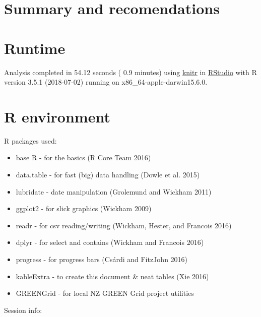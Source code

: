 \documentclass[]{article}
\providecommand{\tightlist}{%
  \setlength{\itemsep}{0pt}\setlength{\parskip}{0pt}}
\theoremstyle{definition}
\theoremstyle{definition}
\theoremstyle{definition}
\theoremstyle{remark}
\begin{document}
\section{Summary and recomendations}\label{summary-and-recomendations}

\section{Runtime}\label{runtime}

Analysis completed in 54.12 seconds ( 0.9 minutes) using
\href{https://cran.r-project.org/package=knitr}{knitr} in
\href{http://www.rstudio.com}{RStudio} with R version 3.5.1 (2018-07-02)
running on x86\_64-apple-darwin15.6.0.

\section{R environment}\label{r-environment}

R packages used:

\begin{itemize}
\tightlist
\item
  base R - for the basics (R Core Team 2016)
\item
  data.table - for fast (big) data handling (Dowle et al. 2015)
\item
  lubridate - date manipulation (Grolemund and Wickham 2011)
\item
  ggplot2 - for slick graphics (Wickham 2009)
\item
  readr - for csv reading/writing (Wickham, Hester, and Francois 2016)
\item
  dplyr - for select and contains (Wickham and Francois 2016)
\item
  progress - for progress bars (Csárdi and FitzJohn 2016)
\item
  kableExtra - to create this document \& neat tables (Xie 2016)
\item
  GREENGrid - for local NZ GREEN Grid project utilities
\end{itemize}

Session info:
\end{document}
